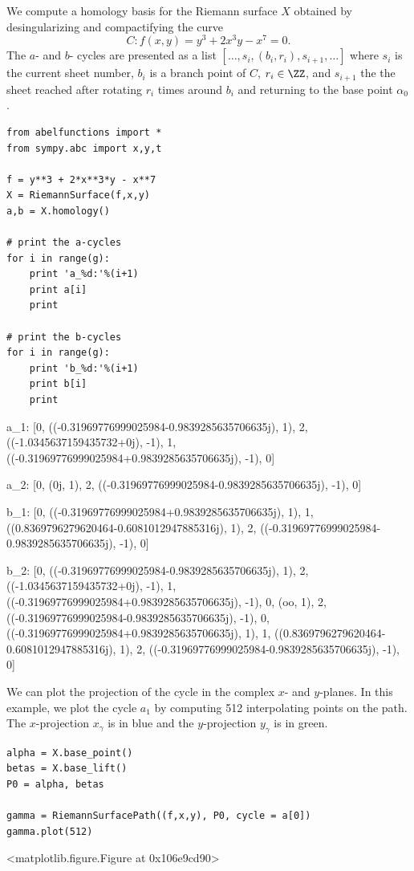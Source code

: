 We compute a homology basis for the Riemann surface $X$ obtained by
desingularizing and compactifying the curve
\[
    C : f(x,y) = y^3 + 2x^3y - x^7 = 0.
\]
The $a$- and $b$- cycles are presented as a list $[\ldots,
  s_i,(b_i,r_i), s_{i+1}, \ldots]$ where $s_i$ is the current sheet
number, $b_i$ is a branch point of $C$, $r_i \in \ZZ$, and $s_{i+1}$ the
the sheet reached after rotating $r_i$ times around $b_i$ and returning
to the base point $\alpha_0$.
\begin{lstlisting}
from abelfunctions import *
from sympy.abc import x,y,t

f = y**3 + 2*x**3*y - x**7
X = RiemannSurface(f,x,y)
a,b = X.homology()

# print the a-cycles
for i in range(g):
    print 'a_%d:'%(i+1)
    print a[i]
    print

# print the b-cycles
for i in range(g):
    print 'b_%d:'%(i+1)
    print b[i]
    print
\end{lstlisting}
\begin{pyoutput}
a_1:
[0, ((-0.31969776999025984-0.9839285635706635j), 1), 2,
 ((-1.0345637159435732+0j), -1), 1,
 ((-0.31969776999025984+0.9839285635706635j), -1), 0]

a_2:
[0, (0j, 1), 2, ((-0.31969776999025984-0.9839285635706635j), -1), 0]

b_1:
[0, ((-0.31969776999025984+0.9839285635706635j), 1), 1,
 ((0.8369796279620464-0.6081012947885316j), 1), 2,
 ((-0.31969776999025984-0.9839285635706635j), -1), 0]


b_2:
[0, ((-0.31969776999025984-0.9839285635706635j), 1), 2,
 ((-1.0345637159435732+0j), -1), 1,
 ((-0.31969776999025984+0.9839285635706635j), -1), 0, (oo, 1), 2,
 ((-0.31969776999025984-0.9839285635706635j), -1), 0,
 ((-0.31969776999025984+0.9839285635706635j), 1), 1,
 ((0.8369796279620464-0.6081012947885316j), 1), 2,
 ((-0.31969776999025984-0.9839285635706635j), -1), 0]
\end{pyoutput}
We can plot the projection of the cycle in the complex $x$- and
$y$-planes. In this example, we plot the cycle $a_1$ by computing 512
interpolating points on the path. The $x$-projection $x_\gamma$ is in
blue and the $y$-projection $y_\gamma$ is in green.
\begin{lstlisting}
alpha = X.base_point()
betas = X.base_lift()
P0 = alpha, betas

gamma = RiemannSurfacePath((f,x,y), P0, cycle = a[0])
gamma.plot(512)
\end{lstlisting}
\begin{pyoutput}
<matplotlib.figure.Figure at 0x106e9cd90>
\end{pyoutput}

